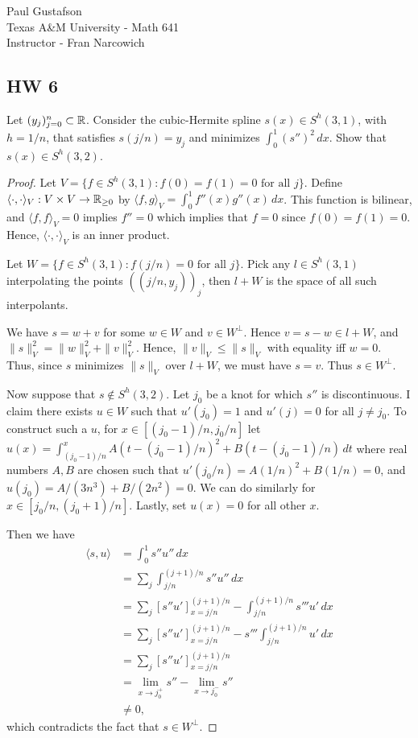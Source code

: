 \documentclass{article}
\begin{document}
\noindent Paul Gustafson\\
\noindent Texas A\&M University - Math 641\\ 
\noindent Instructor - Fran Narcowich

\subsection*{HW 6}
 Let $(y_j)_{j=0}^n \subset \mathbb{R}$. Consider the cubic-Hermite spline $s(x) \in S^h(3,1)$, with $h = 1/n$, that satisfies $s(j/n) = y_j$ and minimizes $\int_0^1 (s'')^2 \, dx$. Show that $s(x) \in S^h(3,2)$.
\begin{proof}
Let $V = \{f \in S^h(3,1) : f(0) = f(1) = 0 \text{ for all } j\}$.  Define $\langle \cdot, \cdot \rangle_V : V \times V \to \mathbb{R}_{\ge 0}$ by $\langle f, g \rangle_V = \int_0^1 f''(x) g''(x) \, dx$.  This function is bilinear, and $\langle f, f \rangle_V = 0$ implies $f'' = 0$ which implies that $f = 0$ since $f(0) = f(1) = 0$. Hence, $\langle \cdot, \cdot \rangle_V$ is an inner product.

Let $W = \{f \in S^h(3,1) : f(j/n) = 0 \text{ for all } j\}$.  Pick any $l \in S^h(3,1)$ interpolating the points $((j/n, y_j))_j$, then $l + W$ is the space of all such interpolants. 

We have $s = w + v$ for some $w \in W$ and $v \in W^\perp$.   Hence $v = s - w \in l + W$, and $\|s\|_V^2 = \|w\|_V^2 + \|v\|_V^2$.  Hence, $\|v\|_V \le \|s\|_V$ with equality iff $w = 0$.  Thus, since $s$ minimizes $\|s\|_V$ over $l + W$, we must have $s = v$.  Thus $s \in W^\perp$.

Now suppose that $s \not \in S^h(3,2)$. Let $j_0$ be a knot for which $s''$ is discontinuous.  I claim there exists $u \in W$ such that $u'(j_0) = 1$ and $u'(j) = 0$ for all $j \neq j_0$.  To construct such a $u$, for $x \in [(j_0-1)/n, j_0/n]$ let 
 $u(x) = \int_{(j_0-1)/n}^{x} A(t-(j_0-1)/n)^2 + B(t -(j_0 -1)/n) \, dt$ 
where real numbers $A, B$ are chosen such that $u'(j_0/n) = A(1/n)^2 + B(1/n) = 0$, and $u(j_0) = A/(3n^3) + B/(2n^2) = 0$.  We can do similarly for $x \in [j_0/n, (j_0+1)/n]$.  Lastly, set $u(x) = 0$ for all other $x$. 

Then we have 
\begin{align*}
\langle s, u \rangle & = \int_0^1 s'' u'' \, dx
\\ & = \sum_j \int_{j/n}^{(j+1)/n} s'' u'' \, dx
\\ & = \sum_j [s'' u']_{x=j/n}^{(j+1)/n} - \int_{j/n}^{(j+1)/n} s''' u' \, dx
\\ & = \sum_j [s'' u']_{x=j/n}^{(j+1)/n} -  s''' \int_{j/n}^{(j+1)/n}  u' \, dx
\\ & = \sum_j [s'' u']_{x=j/n}^{(j+1)/n} 
\\ & = \lim_{x \to j_0^+} s'' - \lim_{x \to j_0^-} s''
\\ & \neq 0,
\end{align*}
which contradicts the fact that $s \in W^\perp$. 
\end{proof}
\end{document}
